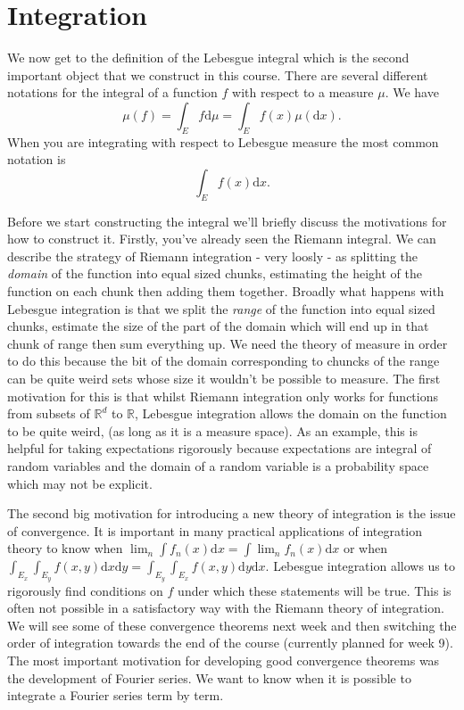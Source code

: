 \documentclass[11pt]{article}
\theoremstyle{definition}
\theoremstyle{remark}
\begin{document}
\section{Integration}
We now get to the definition of the Lebesgue integral which is the second important object that we construct in this course. There are several different notations for the integral of a function $f$ with respect to a measure $\mu$. We have
\[ \mu(f) = \int_E f \mathrm{d}\mu = \int_E f(x) \mu(\mathrm{d}x). \] When you are integrating with respect to Lebesgue measure the most common notation is
\[ \int_E f(x)\mathrm{d}x. \]

Before we start constructing the integral we'll briefly discuss the motivations for how to construct it. Firstly, you've already seen the Riemann integral. We can describe the strategy of Riemann integration - very loosly - as splitting the \emph{domain} of the function into equal sized chunks, estimating the height of the function on each chunk then adding them together. Broadly what happens with Lebesgue integration is that we split the \emph{range} of the function into equal sized chunks, estimate the size of the part of the domain which will end up in that chunk of range then sum everything up. We need the theory of measure in order to do this because the bit of the domain corresponding to chuncks of the range can be quite weird sets whose size it wouldn't be possible to measure. The first motivation for this is that whilst Riemann integration only works for functions from subsets of $\mathbb{R}^d$ to $\mathbb{R}$, Lebesgue integration allows the domain on the function to be quite weird, (as long as it is a measure space). As an example, this is helpful for taking expectations rigorously because expectations are integral of random variables and the domain of a random variable is a probability space which may not be explicit.

The second big motivation for introducing a new theory of integration is the issue of convergence. It is important in many practical applications of integration theory to know when $\lim_n \int f_n(x) \mathrm{d}x = \int \lim_n f_n(x) \mathrm{d}x$ or when $\int_{E_x} \int_{E_y} f(x,y) \mathrm{d}x \mathrm{d}y = \int_{E_y} \int_{E_x} f(x,y) \mathrm{d}y \mathrm{d}x$. Lebesgue integration allows us to rigorously find conditions on $f$ under which these statements will be true. This is often not possible in a satisfactory way with the Riemann theory of integration. We will see some of these convergence theorems next week and then switching the order of integration towards the end of the course (currently planned for week 9). The most important motivation for developing good convergence theorems was the development of Fourier series. We want to know when it is possible to integrate a Fourier series term by term.
\end{document}
